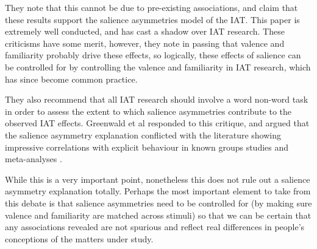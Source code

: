 They note that this cannot be due to pre-existing associations, and claim that these results support the salience asymmetries model of the IAT. This paper is extremely well conducted, and has  cast a shadow over  IAT research. These criticisms have some merit, however, they note in passing that valence and familiarity probably drive these effects, so logically, these effects of salience can be controlled for by controlling the valence and familiarity in IAT research, which has since become common practice. 

They also recommend that all IAT research should involve a word non-word task in order to assess the extent to which salience asymmetries contribute to the observed IAT effects. Greenwald  et al \cite{Greenwald2005} responded to this critique, and argued that the salience asymmetry explanation conflicted with the literature showing impressive correlations with explicit behaviour in known groups studies and meta-analyses \cite{Greenwald2009}. 

While this is a very important point, nonetheless this does not rule out a salience asymmetry explanation totally. Perhaps the most important element to take from this debate is that salience asymmetries need to be controlled for (by making sure valence and familiarity are matched across stimuli) so that we can be certain that any associations revealed are not spurious and reflect real differences in people's conceptions of the matters under study. 




